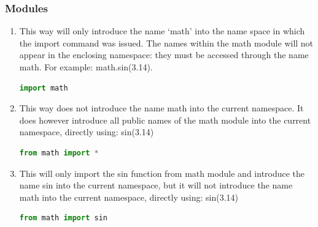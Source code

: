 \begin{frame}[fragile]
  \MyLogo
  \frametitle{Modules}  
\small		

\medskip
{}

\begin{enumerate}
\item This way will only introduce the name `math' into the name space in which the import command was issued. The names within the math module will not appear in the enclosing namespace: they must be accessed through the name math. For example: math.sin(3.14).
\begin{lstlisting}[language=python]
import math
\end{lstlisting}


\item This way does not introduce the name math into the current namespace. It does however introduce all public names of the math module into the current namespace, directly using: sin(3.14)
\begin{lstlisting}[language=python]
from math import *
\end{lstlisting}

\item This will only import the sin function from math module and introduce the name sin into the current namespace, but it will not introduce the name math into the current namespace, directly using: sin(3.14)
\begin{lstlisting}[language=python]
from math import sin
\end{lstlisting}

\end{enumerate}

\end{frame}


